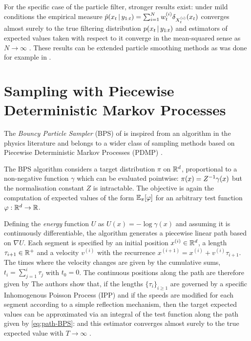 For the specific case of the particle filter, stronger results exist: under mild conditions the empirical measure $\hat p(x_{t}\,|\, y_{1:t})=\sum_{i=1}^{N}w^{(i)}_{t}\delta_{X^{(i)}_{t}}(x_{t})$ converges almost surely to the true filtering distribution $p(x_{t}\,|\, y_{1:t})$ and estimators of expected values taken with respect to it converge in the mean-squared sense as $N\to \infty$ \citep{crisan02}. 
These results can be extended particle smoothing methods as was done for example in \citet{godsill04}.


\section{\label{point:BPS}Sampling with Piecewise Deterministic Markov Processes}
The \emph{Bouncy Particle Sampler} (BPS) of \citet{bouchard15} is inspired from an algorithm in the physics literature \citep{peters12} and belongs to a wider class of sampling methods based on Piecewise Deterministic Markov Processes (PDMP) \citep{bierkens16, bierkens17, wu17, vanetti17}.

The BPS algorithm considers a target distribution $\pi$ on $\mathbb R^{d}$, proportional to a non-negative function $\gamma$ which can be evaluated pointwise: $\pi(x) = Z^{-1} \gamma(x)$
but the normalisation constant $Z$ is intractable. 
The objective is again the computation of expected values of the form $\mathbb E_\pi[\varphi]$ for an arbitrary test function $\varphi:\mathbb R^{d}\to \mathbb R$. 

Defining the \emph{energy} function $U$ as $U(x) = -\log \gamma(x)	$
 and assuming it is continuously differentiable, the algorithm generates a piecewise linear path based on $\nabla U$. 
 Each segment is specified by an initial position $x^{(i)}\in \mathbb R^{d}$, a length $\tau_{i+1}\in \mathbb R^{+}$ and a velocity $v^{(i)}$ with the recurrence $x^{(i+1)}=x^{(i)}+v^{(i)}\tau_{i+1}$. The times where the velocity changes are given by the cumulative sums, $t_i=\sum_{j=1}^{i}\tau_j$ with $t_0=0$. The continuous positions along the path are therefore given by
\eqa{	x(t) &=& x^{(i)} + v^{(i)}(t-t_i), \quad\text{for}\quad t\in[t_i,t_{i+1}).	\label{eq:path-BPS}}
The authors show that, if the lengths $\{\tau_{i}\}_{i\ge 1}$ are governed by a specific Inhomogenous Poisson Process (IPP) and if the speeds are modified for each segment according to a simple reflection mechanism, then the target expected values can be approximated via an integral of the test function along the path given by \eqref{eq:path-BPS}:
and this estimator converges almost surely to the true expected value with $T\to \infty$ \citep[theorem 1]{bouchard15}.

